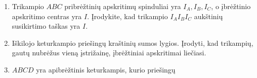 \begin{enumerate}
\begin{center}
\end{center}
\item Trikampio $ABC$ pribrėžtinių apskritimų spinduliai yra
  $I_A, I_B, I_C$, o įbrėžtinio apskritimo centras yra $I$.
  Įrodykite, kad trikampio $I_AI_BI_C$ aukštinių susikirtimo
  taškas yra $I$.
  \item Iškilojo keturkampio priešingų kraštinių sumos lygios.
   Įrodyti, kad trikampių, gautų nubrėžus vieną įstrižainę, 
   įbrėžtiniai apskritimai liečiasi.
\item $ABCD$ yra apibrėžtinis keturkampis, kurio priešingų

\end{enumerate}
